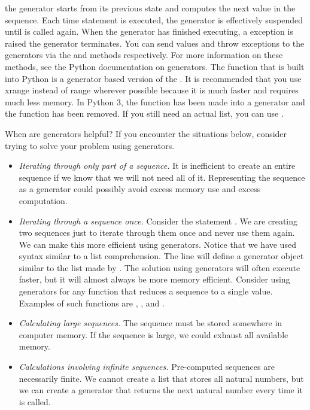 the generator starts from its previous state and computes the next value in the sequence. Each time  statement is executed, the generator is effectively suspended until  is called again.
When the generator has finished executing, a  exception is raised the generator terminates.
You can send values and throw exceptions to the generators via the  and  methods respectively.
For more information on these methods, see the Python documentation on generators.
The  function that is built into Python is a generator based version of the .
It is recommended that you use xrange instead of range wherever possible because it is much faster and requires much less memory.
In Python 3, the  function has been made into a generator and the  function has been removed.
If you still need an actual list, you can use .

When are generators helpful? If you encounter the situations below, consider trying to solve 
your problem using generators.
\begin{itemize}
\item \emph{Iterating through only part of a sequence.}
It is inefficient to create an entire sequence if we know that we will not need all of it.
Representing the sequence as a generator could possibly avoid excess memory use and excess computation.
\item \emph{Iterating through a sequence once.} Consider the statement 
.
We are creating two sequences just to iterate through them once and never use them again.
We can make this more efficient using generators.
Notice that we have used syntax similar to a list comprehension.
The line  will define a generator object similar to the list made by \li{[i for i in xrange(1000) if i\%2 == 0]}.
The solution using generators will often execute faster, but it will almost always be more memory efficient.  Consider using generators for any function that reduces a sequence to a single value.  Examples of such functions are , , and .
\item \emph{Calculating large sequences.}  The sequence must be stored somewhere in computer memory.
If the sequence is large, we could exhaust all available memory.
\item \emph{Calculations involving infinite sequences.}  Pre-computed sequences are necessarily finite.  We cannot create a list that stores all natural numbers, but we can create a generator that returns the next natural number every time it is called.
\end{itemize}


